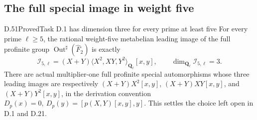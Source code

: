 \subsection{The full special image in weight five}

\begin{statement}{D.51}{Proved}{Task D.1 has dimension three for every prime at least five}
For every prime \(\ell\geq5\), the rational weight-five metabelian
leading image of the full profinite group
\(\operatorname{Out}^{\sharp}(\widehat F_2)\) is exactly
\[
 \mathscr I_{5,\ell}
       =(X+Y)\langle X^2,XY,Y^2\rangle_{\mathbf Q_\ell}[x,y],
 \qquad \dim_{\mathbf Q_\ell}\mathscr I_{5,\ell}=3.
 \tag{D.51.1}
\]
There are actual multiplier-one full profinite special automorphisms
whose three leading images are respectively
\((X+Y)X^2[x,y]\), \((X+Y)XY[x,y]\), and
\((X+Y)Y^2[x,y]\), in the derivation convention
\(D_p(x)=0,\ D_p(y)=[p(X,Y)[x,y],y]\).
This settles the choice left open in D.1 and D.21.
\end{statement}

